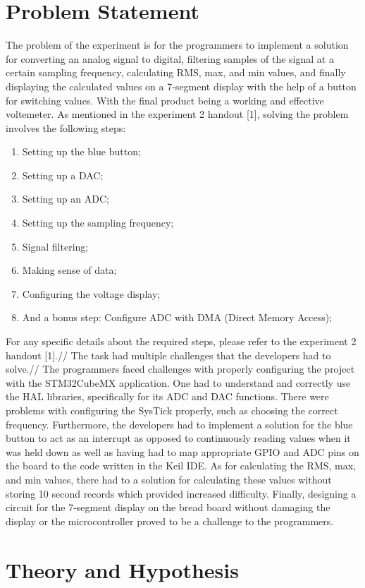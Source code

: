 \documentclass[12pt]{report}
\begin{document}
\section{Problem Statement}
The problem of the experiment is for the programmers to implement a solution for converting an analog signal to digital, filtering samples of the signal at a certain sampling frequency, calculating RMS, max, and min values, and finally displaying the calculated values on a 7-segment display with the help of a button for switching values. With the final product being a working and effective voltemeter.
As mentioned in the experiment 2 handout [1], solving the problem involves the following steps:
\begin{enumerate}
  \item Setting up the blue button;
  \item Setting up a DAC;
  \item Setting up an ADC;
  \item Setting up the sampling frequency;
  \item Signal filtering;
  \item Making sense of data;
  \item Configuring the voltage display;
  \item And a bonus step: Configure ADC with DMA (Direct Memory Access);
\end{enumerate}
For any specific details about the required steps, please refer to the experiment 2 handout [1].//
The task had multiple challenges that the developers had to solve.//
The programmers faced challenges with properly configuring the project with the STM32CubeMX application. One had to understand and correctly use the HAL libraries, specifically for its ADC and DAC functions. There were problems with configuring the SysTick properly, such as choosing the correct frequency. Furthermore, the developers had to implement a solution for the blue button to act as an interrupt as opposed to continuously reading values when it was held down as well as having had to map appropriate GPIO and ADC pins on the board to the code written in the Keil IDE. As for calculating the RMS, max, and min values, there had to a solution for calculating these values without storing 10 second records which provided increased difficulty. Finally, designing a circuit for the 7-segment display on the bread board without damaging the display or the microcontroller proved to be a challenge to the programmers.
\section{Theory and Hypothesis}
\end{document}
